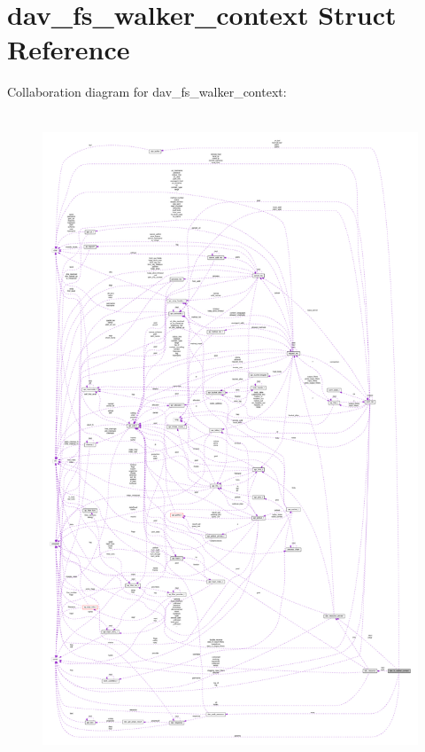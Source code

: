 \hypertarget{structdav__fs__walker__context}{}\section{dav\+\_\+fs\+\_\+walker\+\_\+context Struct Reference}
\label{structdav__fs__walker__context}


Collaboration diagram for dav\+\_\+fs\+\_\+walker\+\_\+context\+:
\nopagebreak
\begin{figure}[H]
\begin{center}
\leavevmode
\includegraphics[height=550pt]{structdav__fs__walker__context__coll__graph}
\end{center}
\end{figure}
